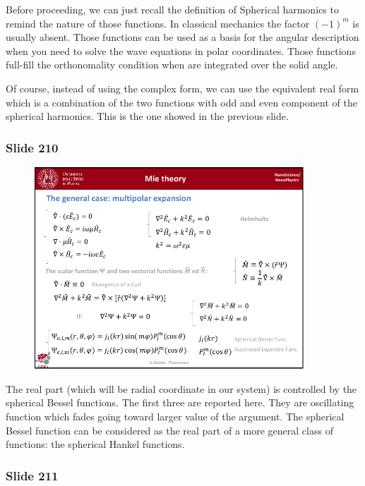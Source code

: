 \documentclass[../main/main.tex]{subfiles}
\begin{document}
Before proceeding, we can just recall the definition of Spherical harmonics to remind the nature of those functions.
In classical mechanics the factor \( (-1)^m \) is usually absent.
Those functions can be used as a basis for the angular description when you need to solve the wave equations in polar coordinates.
Those functions full-fill the orthonomality condition when are integrated over the solid angle.

Of course, instead of using the complex form, we can use the equivalent real form which is a combination of the two functions with odd and even component of the spherical harmonics.
This is the one showed in the previous slide.

\newpage

\subsubsection{Slide 210}

\begin{figure}[h!]
\centering
\includegraphics[page=3,width=0.9\textwidth]{../lessons/pdf_file/13_lesson.pdf}
\end{figure}

The real part (which will be radial coordinate in our system) is controlled by the spherical Bessel functions. The first three are reported here.
They are oscillating function which fades going toward larger value of the argument.
The spherical Bessel function can be considered as the real part of a more general class of functions: the spherical Hankel functions.


\newpage

\subsubsection{Slide 211}
\end{document}
